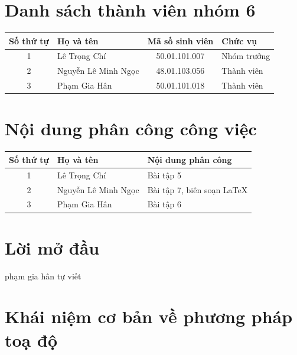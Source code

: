 \documentclass[12pt,a4]{article}
\begin{document}
\begin{titlepage}
\tableofcontents
\newpage

\section{Danh sách thành viên nhóm 6}
\begin{tabular}{|c|l|c|l|}
    \hline
    \textbf{Số thứ tự} & \textbf{Họ và tên} & \textbf{Mã số sinh viên} & \textbf{Chức vụ} \\ \hline
    1 & Lê Trọng Chí & 50.01.101.007 & Nhóm trưởng \\ \hline
    2 & Nguyễn Lê Minh Ngọc & 48.01.103.056 & Thành viên \\ \hline
    3 & Phạm Gia Hân & 50.01.101.018 & Thành viên \\ \hline
    \end{tabular}
\newpage
\section{Nội dung phân công công việc}
\begin{tabular}{|c|l|l|}
    \hline
    \textbf{Số thứ tự} & \textbf{Họ và tên} & \textbf{Nội dung phân công} \\ \hline
    1 & Lê Trọng Chí & Bài tập 5 \\ \hline
    2 & Nguyễn Lê Minh Ngọc & Bài tập 7, biên soạn \LaTeX \\ \hline
    3 & Phạm Gia Hân & Bài tập 6 \\ \hline
    \end{tabular}
    \newpage
\section{Lời mở đầu}
phạm gia hân tự viết
\section{Khái niệm cơ bản về phương pháp toạ độ}

\end{titlepage}
\end{document}
